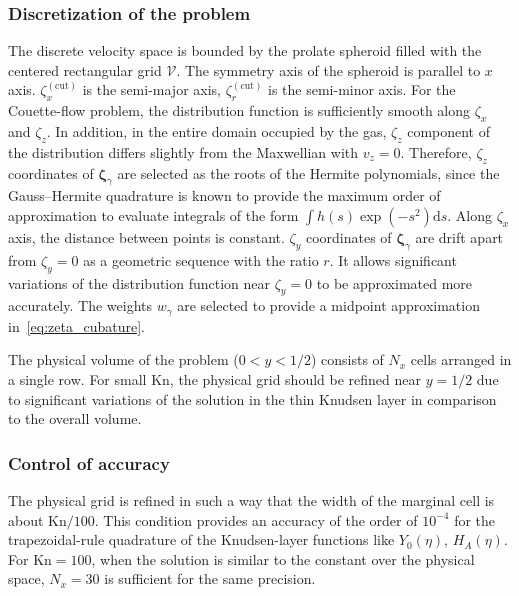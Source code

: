 \documentclass[aip,pof,preprint]{revtex4-1}
\newcommand{\Kn}{\mathrm{Kn}}
\newcommand{\dd}{\mathrm{d}}
\newcommand{\bzeta}{\boldsymbol{\zeta}}
\begin{document}
\subsubsection{Discretization of the problem}

The discrete velocity space is bounded by the prolate spheroid
filled with the centered rectangular grid \(\mathcal{V}\).
The symmetry axis of the spheroid is parallel to \(x\) axis.
\(\zeta^{(\mathrm{cut})}_x\) is the semi-major axis, \(\zeta^{(\mathrm{cut})}_r\) is the semi-minor axis.
For the Couette-flow problem, the distribution function is sufficiently smooth along \(\zeta_x\) and \(\zeta_z\).
In addition, in the entire domain occupied by the gas, \(\zeta_z\) component of the distribution
differs slightly from the Maxwellian with \(v_z=0\).
Therefore, \(\zeta_z\) coordinates of \(\bzeta_\gamma\) are selected as the roots of the Hermite polynomials,
since the Gauss--Hermite quadrature is known to provide the maximum order of approximation
to evaluate integrals of the form \(\int h(s)\exp(-s^2)\dd{s}\).
Along \(\zeta_x\) axis, the distance between points is constant.
\(\zeta_y\) coordinates of \(\bzeta_\gamma\) are drift apart from \(\zeta_y=0\)
as a geometric sequence with the ratio \(r\).
It allows significant variations of the distribution function near \(\zeta_y=0\) to be approximated more accurately.
The weights \(w_\gamma\) are selected to provide a midpoint approximation in~\eqref{eq:zeta_cubature}.

The physical volume of the problem (\(0<y<1/2\)) consists of \(N_x\) cells arranged in a single row.
For small \(\Kn\), the physical grid should be refined near \(y=1/2\)
due to significant variations of the solution in the thin Knudsen layer in comparison to the overall volume.

\subsubsection{Control of accuracy}

The physical grid is refined in such a way
that the width of the marginal cell is about \(\Kn/100\).
This condition provides an accuracy of the order of \(10^{-4}\) for the trapezoidal-rule quadrature
of the Knudsen-layer functions like \(Y_0(\eta)\), \(H_A(\eta)\).
For \(\Kn=100\), when the solution is similar to the constant over the physical space,
\(N_x = 30\) is sufficient for the same precision.
\end{document}
